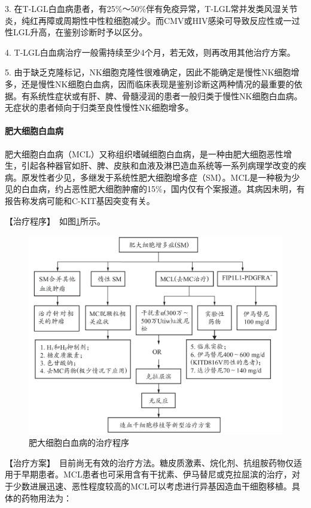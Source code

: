 3.
在T-LGL白血病患者，有25\%～50\%伴有免疫异常，T-LGL常并发类风湿关节炎，纯红再障或周期性中性粒细胞减少。而CMV或HIV感染可导致反应性或一过性LGL升高，在鉴别诊断时予以区分。

4. T-LGL白血病治疗一般需持续至少4个月，若无效，则再改用其他治疗方案。

5.
由于缺乏克隆标记，NK细胞克隆性很难确定，因此不能确定是慢性NK细胞增多，还是慢性NK细胞白血病，因而临床表现是鉴别诊断这两种情况的最重要的依据。有系统性症状或有肝、脾、骨髓浸润的患者一般归类于慢性NK细胞白血病。无症状的患者倾向于归类至良性慢性NK细胞增多。

\paragraph{肥大细胞白血病}

肥大细胞白血病（MCL）又称组织嗜碱细胞白血病，是一种由肥大细胞恶性增生，引起各种器官如肝、脾、皮肤和血液及淋巴造血系统等一系列病理学改变的疾病。原发性者少见，多继发于系统性肥大细胞增多症（SM）。MCL是一种极为少见的白血病，约占恶性肥大细胞肿瘤的15\%，国内仅有个案报道。其病因未明，有报告称发病可能和C-KIT基因突变有关。

【治疗程序】　如图\ref{fig5-1-16}所示。

\begin{figure}[!htbp]
 \centering
 \includegraphics{./images/Image00149.jpg}
 \captionsetup{justification=centering}
 \caption{肥大细胞白血病的治疗程序}
 \label{fig5-1-16}
  \end{figure} 

【治疗方案】　目前尚无有效的治疗方法。糖皮质激素、烷化剂、抗组胺药物仅适用于早期患者。MCL患者也可采用含有干扰素、伊马替尼或克拉屈滨的治疗，对于少数进展迅速、恶性程度较高的MCL可以考虑进行异基因造血干细胞移植。具体的药物用法为：

